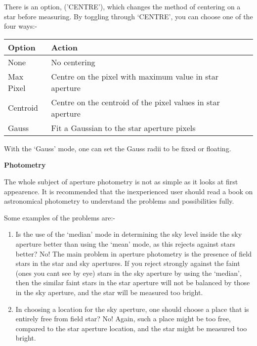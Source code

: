 \begin{small}
{{   There is an option, ('CENTRE'), which changes the method of
   centering on a star before measuring. By toggling through `CENTRE',
   you can choose one of the four ways:-
                               
\hspace*{4ex}\begin{tabular}{|l|l|}  \hline
    Option    &  Action \\ \hline
    None      &  No centering \\
    Max Pixel &  Centre on the pixel with maximum value in star aperture \\
    Centroid  & Centre on the centroid of the pixel values in star aperture \\
    Gauss    &   Fit a Gaussian to the star aperture pixels \\ \hline
\end{tabular}
   
   With the `Gauss' mode, one can set the Gauss radii to be fixed or
   floating.
                                                                              
\vspace*{1mm}
{\bf Photometry}
\vspace*{1mm}
   

   The whole subject of aperture photometry is not as simple as
   it looks at first appearence. It is recommended that the
   inexperienced user should read a book on astronomical photometry
   to understand the problems and possibilities fully.
   
   Some examples of the problems are:-

\begin{enumerate}
   
\item Is the use of the `median' mode in determining the sky level
      inside the sky aperture better than using the `mean'
      mode, as this rejects against stars better? No! The main
      problem in aperture photometry is the presence of field stars
      in the star and sky apertures. If you reject strongly against
      the faint (ones you cant see by eye) stars in the sky
      aperture by using the `median', then the similar faint stars
      in the star aperture will not be balanced by those in the
      sky aperture, and the star will be measured too bright.
                                                                              
\item In choosing a location for the sky aperture, one should
      choose a place that is entirely free from field star? No!
      Again, such a place might be too free, compared to the star
      aperture location, and the star might be measured too bright.
                                                                              

\end{enumerate}}}
\end{small}
